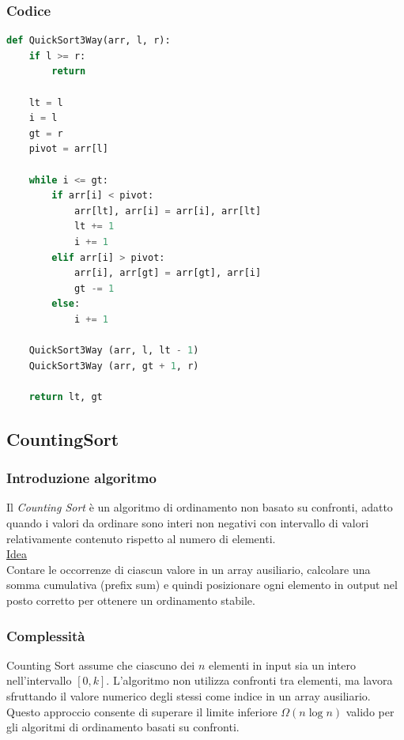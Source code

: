 \documentclass[a4paper, 11pt]{article}
\begin{document}
\subsubsection{Codice}
\begin{lstlisting}[style=mycodestyle, language=Python]
    def QuickSort3Way(arr, l, r):
    if l >= r:
        return

    lt = l
    i = l
    gt = r
    pivot = arr[l]

    while i <= gt:
        if arr[i] < pivot:
            arr[lt], arr[i] = arr[i], arr[lt]
            lt += 1
            i += 1
        elif arr[i] > pivot:
            arr[i], arr[gt] = arr[gt], arr[i]
            gt -= 1
        else:
            i += 1

    QuickSort3Way (arr, l, lt - 1)
    QuickSort3Way (arr, gt + 1, r)

    return lt, gt
\end{lstlisting}

\subsection{CountingSort}

\subsubsection*{Introduzione algoritmo}
Il \emph{Counting Sort} è un algoritmo di ordinamento non basato su confronti, adatto quando i valori da ordinare sono interi non negativi con intervallo di valori relativamente contenuto rispetto al numero di elementi. \\

\noindent  \underline{Idea} \\ Contare le occorrenze di ciascun valore in un array ausiliario, calcolare una somma cumulativa (prefix sum) e quindi posizionare ogni elemento in output nel posto corretto per ottenere un ordinamento stabile.

\subsubsection*{Complessità}

\noindent Counting Sort assume che ciascuno dei \(n\) elementi in input sia un intero nell’intervallo \([0, k]\). L'algoritmo non utilizza confronti tra elementi, ma lavora sfruttando il valore numerico degli stessi come indice in un array ausiliario. Questo approccio consente di superare il limite inferiore \(\Omega(n \log n)\) valido per gli algoritmi di ordinamento basati su confronti.
\end{document}
